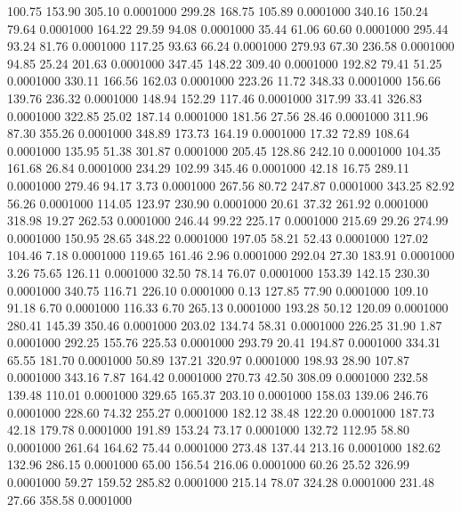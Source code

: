  100.75  153.90  305.10   0.0001000
 299.28  168.75  105.89   0.0001000
 340.16  150.24   79.64   0.0001000
 164.22   29.59   94.08   0.0001000
  35.44   61.06   60.60   0.0001000
 295.44   93.24   81.76   0.0001000
 117.25   93.63   66.24   0.0001000
 279.93   67.30  236.58   0.0001000
  94.85   25.24  201.63   0.0001000
 347.45  148.22  309.40   0.0001000
 192.82   79.41   51.25   0.0001000
 330.11  166.56  162.03   0.0001000
 223.26   11.72  348.33   0.0001000
 156.66  139.76  236.32   0.0001000
 148.94  152.29  117.46   0.0001000
 317.99   33.41  326.83   0.0001000
 322.85   25.02  187.14   0.0001000
 181.56   27.56   28.46   0.0001000
 311.96   87.30  355.26   0.0001000
 348.89  173.73  164.19   0.0001000
  17.32   72.89  108.64   0.0001000
 135.95   51.38  301.87   0.0001000
 205.45  128.86  242.10   0.0001000
 104.35  161.68   26.84   0.0001000
 234.29  102.99  345.46   0.0001000
  42.18   16.75  289.11   0.0001000
 279.46   94.17    3.73   0.0001000
 267.56   80.72  247.87   0.0001000
 343.25   82.92   56.26   0.0001000
 114.05  123.97  230.90   0.0001000
  20.61   37.32  261.92   0.0001000
 318.98   19.27  262.53   0.0001000
 246.44   99.22  225.17   0.0001000
 215.69   29.26  274.99   0.0001000
 150.95   28.65  348.22   0.0001000
 197.05   58.21   52.43   0.0001000
 127.02  104.46    7.18   0.0001000
 119.65  161.46    2.96   0.0001000
 292.04   27.30  183.91   0.0001000
   3.26   75.65  126.11   0.0001000
  32.50   78.14   76.07   0.0001000
 153.39  142.15  230.30   0.0001000
 340.75  116.71  226.10   0.0001000
   0.13  127.85   77.90   0.0001000
 109.10   91.18    6.70   0.0001000
 116.33    6.70  265.13   0.0001000
 193.28   50.12  120.09   0.0001000
 280.41  145.39  350.46   0.0001000
 203.02  134.74   58.31   0.0001000
 226.25   31.90    1.87   0.0001000
 292.25  155.76  225.53   0.0001000
 293.79   20.41  194.87   0.0001000
 334.31   65.55  181.70   0.0001000
  50.89  137.21  320.97   0.0001000
 198.93   28.90  107.87   0.0001000
 343.16    7.87  164.42   0.0001000
 270.73   42.50  308.09   0.0001000
 232.58  139.48  110.01   0.0001000
 329.65  165.37  203.10   0.0001000
 158.03  139.06  246.76   0.0001000
 228.60   74.32  255.27   0.0001000
 182.12   38.48  122.20   0.0001000
 187.73   42.18  179.78   0.0001000
 191.89  153.24   73.17   0.0001000
 132.72  112.95   58.80   0.0001000
 261.64  164.62   75.44   0.0001000
 273.48  137.44  213.16   0.0001000
 182.62  132.96  286.15   0.0001000
  65.00  156.54  216.06   0.0001000
  60.26   25.52  326.99   0.0001000
  59.27  159.52  285.82   0.0001000
 215.14   78.07  324.28   0.0001000
 231.48   27.66  358.58   0.0001000
